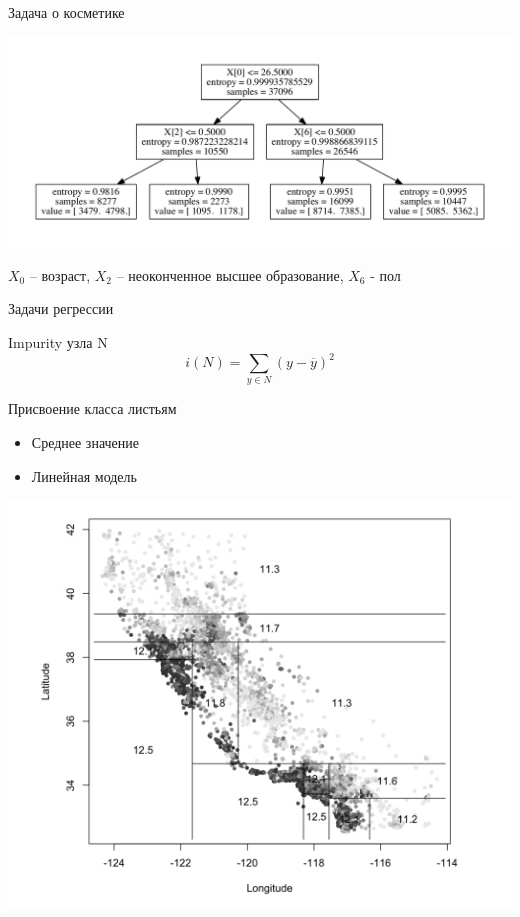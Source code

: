 \documentclass[aspectratio=169]{beamer}
\begin{document}
\begin{frame}{Задача о косметике}

\begin{center}
\includegraphics[scale=0.45]{images/model.pdf}
\end{center}

$X_0$ -- возраст, $X_2$ -- неоконченное высшее образование, $X_6$ - пол

\end{frame}

\begin{frame}{Задачи регрессии}

Impurity узла N
\[
i(N) = \sum_{y \in N} (y - \overline{y})^2
\]

Присвоение класса листьям
\begin{itemize}
\item Среднее значение
\item Линейная модель
\end{itemize}

\includegraphics[scale=0.3]{images/housing.png}

\end{frame}
\end{document}
